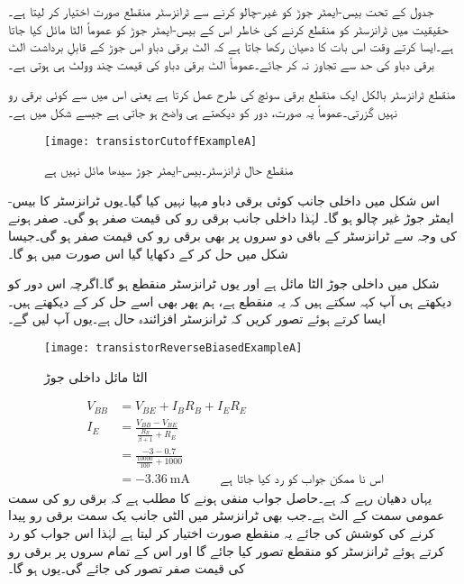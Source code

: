 	جدول کے تحت بیس-ایمٹر  جوڑ کو غیر-چالو کرنے سے ٹرانزسٹر منقطع صورت اختیار کر لیتا ہے۔حقیقیت میں ٹرانزسٹر کو منقطع کرنے کی خاطر اس کے بیس-ایمٹر  جوڑ کو عموماً الٹا مائل کیا جاتا ہے۔ایسا کرتے وقت اس بات کا دھیان رکھا جاتا ہے کہ الٹ برقی دباو اس جوڑ کے قابلِ برداشت الٹ برقی دباو  کی حد سے تجاوز نہ کر جائے۔عموماً الٹ برقی دباو کی قیمت چند وولٹ  ہی ہوتی ہے۔ 

منقطع ٹرانزسٹر بالکل ایک منقطع برقی سوئچ کی طرح عمل کرتا ہے یعنی اس میں سے  کوئی برقی رو نہیں گزرتی۔عموماً یہ صورت، دور کو دیکھتے ہی واضح ہو جاتی ہے جیسے شکل  میں ہے۔
\begin{figure}
\centering
\texttt{[image: transistorCutoffExampleA]}
\caption{منقطع حال ٹرانزسٹر۔بیس-ایمٹر  جوڑ سیدھا مائل نہیں ہے}
\label{شکل_منقطع_ٹرانزسٹر_کی_مثال}
\end{figure}
اس شکل میں داخلی جانب کوئی برقی دباو مہیا نہیں کیا گیا۔یوں ٹرانزسٹر کا بیس-ایمٹر  جوڑ غیر چالو ہو گا۔ لہٰذا داخلی جانب برقی رو  کی قیمت صفر ہو گی۔  صفر ہونے کی وجہ سے ٹرانزسٹر کے باقی دو سروں پر بھی برقی رو کی قیمت صفر ہو گی۔جیسا شکل میں حل کر کے دکھایا گیا اس صورت میں  ہو گا۔

شکل   میں داخلی جوڑ الٹا مائل ہے اور یوں ٹرانزسٹر منقطع ہو گا۔اگرچہ اس دور کو دیکھتے ہی آپ کہہ سکتے ہیں کہ یہ منقطع ہے، ہم پھر بھی اسے حل کر کے دیکھتے ہیں۔ایسا کرتے ہوئے تصور کریں کہ ٹرانزسٹر افزائندہ حال ہے۔یوں آپ  لیں گے۔
\begin{figure}
\centering
\texttt{[image: transistorReverseBiasedExampleA]}
\caption{ الٹا مائل داخلی جوڑ}
\label{شکل_الٹا_مائل_داخلی_جوڑ}
\end{figure}
%
\begin{align*}
V_{BB}&=V_{BE}+I_B R_B +I_E R_E\\
I_E &=\frac{V_{BB}-V_{BE}}{\frac{R_B}{\beta+1}+R_E}\\
&=\frac{-3-0.7}{\frac{10000}{100}+1000}\\
&=\SI{-3.36}{\milli \ampere} \hspace{1cm} \text{اس نا ممکن جواب کو رد کیا جاتا ہے}
\end{align*}
یہاں دھیان رہے کہ  ہے۔حاصل جواب منفی ہونے کا مطلب ہے کہ برقی رو کی سمت عمومی سمت کے الٹ ہے۔جب بھی ٹرانزسٹر میں الٹی جانب یک سمت برقی رو پیدا کرنے کی کوشش کی جائے یہ منقطع صورت اختیار کر لیتا ہے لہٰذا اس جواب کو رد کرتے ہوئے ٹرانزسٹر کو منقطع تصور کیا جائے گا اور اس کے تمام سروں پر برقی رو کی قیمت صفر تصور کی جائے گی۔یوں  ہو گا۔

